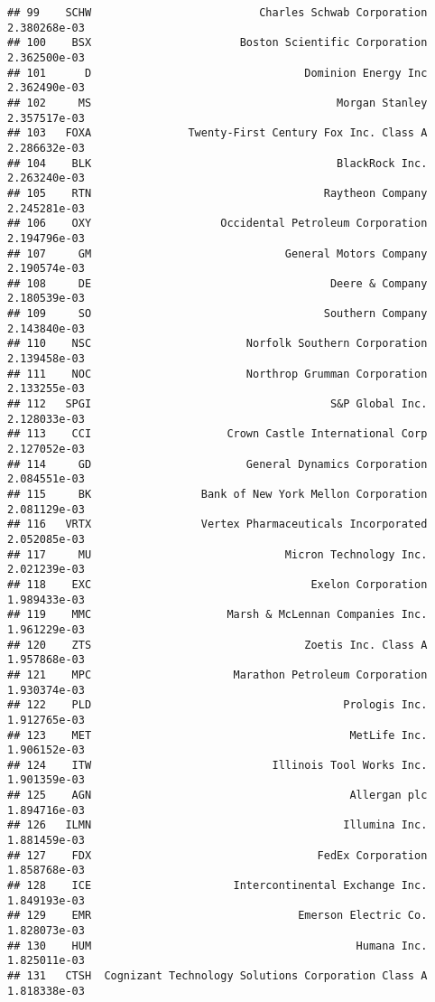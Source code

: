 \documentclass[
]{article}
\begin{document}
\begin{verbatim}
## 99    SCHW                          Charles Schwab Corporation 2.380268e-03
## 100    BSX                       Boston Scientific Corporation 2.362500e-03
## 101      D                                 Dominion Energy Inc 2.362490e-03
## 102     MS                                      Morgan Stanley 2.357517e-03
## 103   FOXA               Twenty-First Century Fox Inc. Class A 2.286632e-03
## 104    BLK                                      BlackRock Inc. 2.263240e-03
## 105    RTN                                    Raytheon Company 2.245281e-03
## 106    OXY                    Occidental Petroleum Corporation 2.194796e-03
## 107     GM                              General Motors Company 2.190574e-03
## 108     DE                                     Deere & Company 2.180539e-03
## 109     SO                                    Southern Company 2.143840e-03
## 110    NSC                        Norfolk Southern Corporation 2.139458e-03
## 111    NOC                        Northrop Grumman Corporation 2.133255e-03
## 112   SPGI                                     S&P Global Inc. 2.128033e-03
## 113    CCI                     Crown Castle International Corp 2.127052e-03
## 114     GD                        General Dynamics Corporation 2.084551e-03
## 115     BK                 Bank of New York Mellon Corporation 2.081129e-03
## 116   VRTX                 Vertex Pharmaceuticals Incorporated 2.052085e-03
## 117     MU                              Micron Technology Inc. 2.021239e-03
## 118    EXC                                  Exelon Corporation 1.989433e-03
## 119    MMC                     Marsh & McLennan Companies Inc. 1.961229e-03
## 120    ZTS                                 Zoetis Inc. Class A 1.957868e-03
## 121    MPC                      Marathon Petroleum Corporation 1.930374e-03
## 122    PLD                                       Prologis Inc. 1.912765e-03
## 123    MET                                        MetLife Inc. 1.906152e-03
## 124    ITW                            Illinois Tool Works Inc. 1.901359e-03
## 125    AGN                                        Allergan plc 1.894716e-03
## 126   ILMN                                       Illumina Inc. 1.881459e-03
## 127    FDX                                   FedEx Corporation 1.858768e-03
## 128    ICE                      Intercontinental Exchange Inc. 1.849193e-03
## 129    EMR                                Emerson Electric Co. 1.828073e-03
## 130    HUM                                         Humana Inc. 1.825011e-03
## 131   CTSH  Cognizant Technology Solutions Corporation Class A 1.818338e-03

\end{verbatim}
\end{document}
